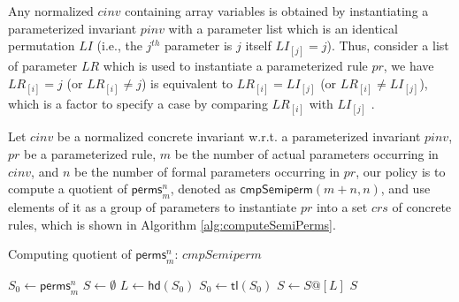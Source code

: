 \documentclass[final]{IEEEtran}
\newcommand\lyj[1]{\textcolor{magenta}{lyj: #1}}
\begin{document}
Any normalized $cinv$ containing array variables is obtained by instantiating a parameterized invariant $pinv$ with a parameter list which is an identical permutation $LI$ (i.e., the $j^{th}$ parameter is $j$ itself $LI_{[j]}=j$). Thus, consider a list of parameter $LR$ which is used to instantiate a parameterized rule $pr$, we  have $LR_{[i]}=j$ (or $LR_{[i]}\ne j$) is equivalent to $LR_{[i]}=LI_{[j]}$ (or $LR_{[i]}\ne LI_{[j]}$), %
which is a factor to specify a case by comparing $LR_{[i]}$ with $LI_{[j]}$ .  %


Let $cinv$  be a normalized concrete invariant w.r.t. a parameterized invariant $pinv$, $pr$ be a parameterized rule, $m$ be the number of actual parameters occurring in $cinv$, and $n$  be the number of formal parameters occurring in $pr$,  our policy is to compute a quotient of $\mathsf{perms}_{m}^{n}$, denoted as $\mathsf{cmpSemiperm}(m+n,n )$, and use elements of it as a group of parameters to instantiate $pr$ into a set $crs$ of concrete rules, which is shown in Algorithm \ref{alg:computeSemiPerms}.%
\begin{algorithm}
\caption{Computing quotient of $\mathsf{perms}_{m}^{n}$: $cmpSemiperm$ \label{alg:computeSemiPerms}}%



{
    $S_0\leftarrow \mathsf{perms}_m^n$\;
     $S\leftarrow \emptyset $\;
      {$L \leftarrow \mathsf{hd}(S_0)$\;
       $S_0 \leftarrow \mathsf{tl}(S_0)$\;
        { $S\leftarrow S@[L]$\;}
      }
    \Return $S$\;
}


\end{algorithm}
\end{document}
